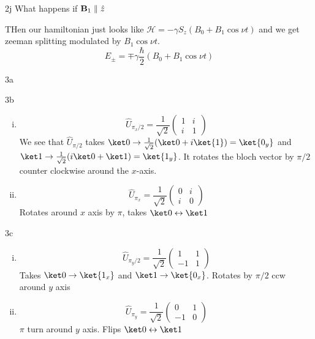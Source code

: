 \documentclass[12pt]{article}
\newcommand{\HH}{\mathcal{H}}
\begin{document}
\begin{exc}{2j}
    What happens if $\vb B_1 \parallel \vu z$
\end{exc}
\begin{ans}
    THen our hamiltonian just looks like $\HH = -\gamma S_z (B_0 + B_1\cos\nu t)$ and we get zeeman splitting modulated by $B_1 \cos \nu t$.
    \[E_{\pm} = \mp \gamma \frac{\hbar}2 (B_0 + B_1\cos\nu t)\]
\end{ans}

\newpage 
\begin{exc}{3a}

\end{exc}

\begin{exc}{3b} 

\end{exc}
\begin{ans}
\begin{enumerate}[(i)]
    \item \[\hat U_{\pi_x/2} = \frac1{\sqrt 2}\begin{pmatrix}
        1 & i \\ i & 1
    \end{pmatrix}\]
    We see that $\hat U_{\pi/2}$ takes $\ket 0 \to \frac1{\sqrt 2}({\ket 0 + i\ket{1}}) = \ket{0_y}$ and $\ket 1 \to \frac1{\sqrt 2}(i \ket 0 + \ket 1) = \ket{1_y}$. It rotates the bloch vector by $\pi/2$ counter clockwise around the $x$-axis.

    \item \[\hat U_{\pi_x} = \frac1{\sqrt 2}\begin{pmatrix}
        0 & i \\ i & 0
    \end{pmatrix}\]
    Rotates around $x$ axis by $\pi$, takes $\ket 0 \leftrightarrow \ket 1$ 
\end{enumerate}
\end{ans}

\begin{exc}{3c}

\end{exc}
\begin{ans}
    \begin{enumerate}[(i)]
        \item \[\hat U_{\pi_y/2} = \frac1{\sqrt 2}\begin{pmatrix}
        1 & 1 \\ -1 & 1
    \end{pmatrix}\]
    Takes $\ket 0 \to \ket{1_x}$ and $\ket 1 \to \ket{0_x}$. Rotates by $\pi/2$ ccw around $y$ axis
    \item  \[\hat U_{\pi_y} = \frac1{\sqrt 2}\begin{pmatrix}
        0 & 1 \\ -1 & 0
    \end{pmatrix}\]
    $\pi$ turn around $y$ axis. Flips $\ket 0 \leftrightarrow \ket 1$
    \end{enumerate}
\end{ans}
\end{document}
